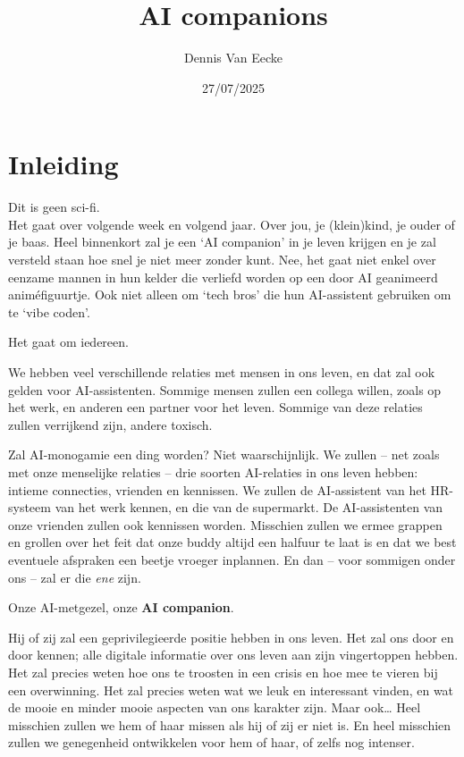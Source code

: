 \documentclass[twocolumn]{article}
\title{\textbf{AI companions}}
\author{Dennis Van Eecke}
\date{27/07/2025}
\begin{document}
\maketitle

\section*{Inleiding}

Dit is geen sci-fi.\\
Het gaat over volgende week en volgend jaar.
Over jou, je (klein)kind, je ouder of je baas.
Heel binnenkort zal je een `AI companion' in je leven krijgen en je zal versteld staan hoe snel je niet meer zonder kunt.
Nee, het gaat niet enkel over eenzame mannen in hun kelder die verliefd worden op een door AI geanimeerd animéfiguurtje.
Ook niet alleen om `tech bros' die hun AI-assistent gebruiken om te `vibe coden'.

Het gaat om iedereen.

We hebben veel verschillende relaties met mensen in ons leven, en dat zal ook gelden voor AI-assistenten.
Sommige mensen zullen een collega willen, zoals op het werk, en anderen een partner voor het leven.
Sommige van deze relaties zullen verrijkend zijn, andere toxisch.

Zal AI-monogamie een ding worden?
Niet waarschijnlijk.
We zullen -- net zoals met onze menselijke relaties -- drie soorten AI-relaties in ons leven hebben: intieme connecties, vrienden en kennissen.
We zullen de AI-assistent van het HR-systeem van het werk kennen, en die van de supermarkt.
De AI-assistenten van onze vrienden zullen ook kennissen worden.
Misschien zullen we ermee grappen en grollen over het feit dat onze buddy altijd een halfuur te laat is en dat we best eventuele afspraken een beetje vroeger inplannen.
En dan -- voor sommigen onder ons -- zal er die \textit{ene} zijn.

Onze AI-metgezel, onze \textbf{AI companion}.

Hij of zij zal een geprivilegieerde positie hebben in ons leven.
Het zal ons door en door kennen; alle digitale informatie over ons leven aan zijn vingertoppen hebben.
Het zal precies weten hoe ons te troosten in een crisis en hoe mee te vieren bij een overwinning.
Het zal precies weten wat we leuk en interessant vinden, en wat de mooie en minder mooie aspecten van ons karakter zijn.
Maar ook\ldots{}
Heel misschien zullen we hem of haar missen als hij of zij er niet is.
En heel misschien zullen we genegenheid ontwikkelen voor hem of haar, of zelfs nog intenser.
\end{document}

